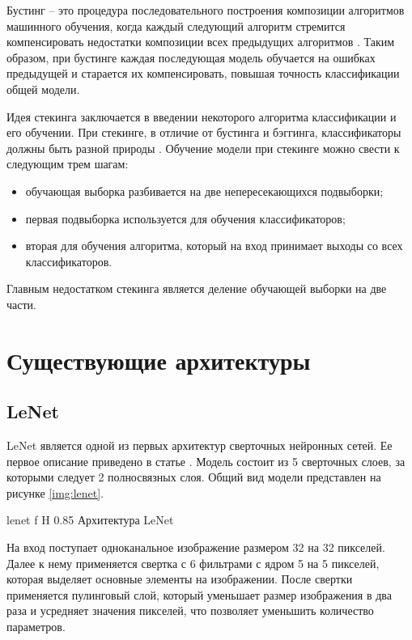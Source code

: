 Бустинг -- это процедура последовательного построения композиции алгоритмов машинного обучения, когда каждый следующий алгоритм стремится компенсировать недостатки композиции всех предыдущих алгоритмов \cite{ansambles}. Таким образом, при бустинге каждая последующая модель обучается на ошибках предыдущей и старается их компенсировать, повышая точность классификации общей модели.

Идея стекинга заключается в введении некоторого алгоритма классификации и его обучении. При стекинге, в отличие от бустинга и бэггинга, классификаторы должны быть разной природы \cite{ansambles}. Обучение модели при стекинге можно свести к следующим трем шагам:
\begin{itemize}
	\item обучающая выборка разбивается на две непересекающихся подвыборки;
	\item первая подвыборка используется для обучения классификаторов;
	\item вторая для обучения алгоритма, который на вход принимает выходы со всех классификаторов.
\end{itemize}

Главным недостатком стекинга является деление обучающей выборки на две части.

\section{Существующие архитектуры}
\subsection{LeNet}

LeNet является одной из первых архитектур сверточных нейронных сетей. Ее первое описание приведено в статье \cite{lenet}. Модель состоит из 5 сверточных слоев, за которыми следует 2 полносвязных слоя. Общий вид модели представлен на рисунке \ref{img:lenet}.

{lenet} %
{f} %
{H} %
{0.85\textwidth} %
{Архитектура LeNet} %

На вход поступает одноканальное изображение размером 32 на 32 пикселей. Далее к нему применяется свертка с 6 фильтрами с ядром 5 на 5 пикселей, которая выделяет основные элементы на изображении. После свертки применяется пулинговый слой, который уменьшает размер изображения в два раза и усредняет значения пикселей, что позволяет уменьшить количество параметров.


